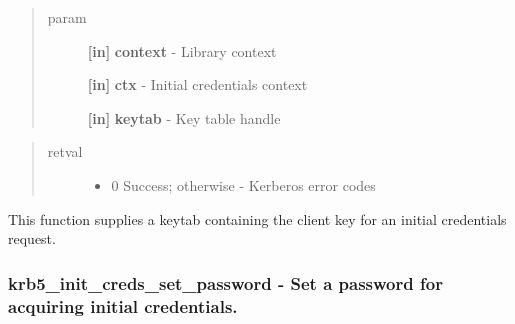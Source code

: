 \documentclass[letterpaper,10pt,english]{sphinxmanual}
\begin{document}
\begin{quote}\begin{description}
\item[{param}] \leavevmode
\textbf{{[}in{]}} \textbf{context} - Library context

\textbf{{[}in{]}} \textbf{ctx} - Initial credentials context

\textbf{{[}in{]}} \textbf{keytab} - Key table handle

\end{description}\end{quote}
\begin{quote}\begin{description}
\item[{retval}] \leavevmode\begin{itemize}
\item {} 
0   Success; otherwise - Kerberos error codes

\end{itemize}

\end{description}\end{quote}

This function supplies a keytab containing the client key for an initial credentials request.


\subsubsection{krb5\_init\_creds\_set\_password -  Set a password for acquiring initial credentials.}
\label{appdev/refs/api/krb5_init_creds_set_password:krb5-init-creds-set-password-set-a-password-for-acquiring-initial-credentials}\label{appdev/refs/api/krb5_init_creds_set_password::doc}

\begin{fulllineitems}
\label{appdev/refs/api/krb5_init_creds_set_password:krb5_init_creds_set_password}
\end{fulllineitems}
\end{document}
